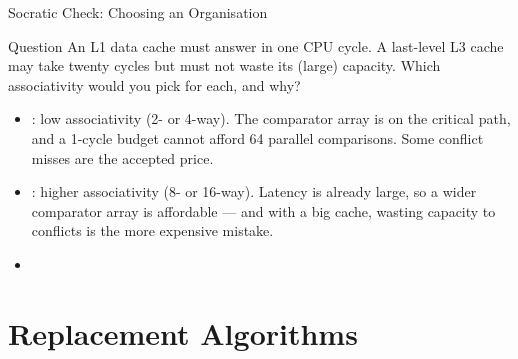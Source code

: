 \documentclass[aspectratio=169]{beamer}
\begin{document}
\begin{frame}{Socratic Check: Choosing an Organisation}
  \begin{alertblock}{Question}
    An L1 data cache must answer in one CPU cycle. A last-level L3 cache may
    take twenty cycles but must not waste its (large) capacity. Which
    associativity would you pick for each, and why?
  \end{alertblock}
  \begin{itemize}
    \item {}: low associativity (2- or 4-way). The comparator array is
      on the critical path, and a 1-cycle budget cannot afford 64 parallel
      comparisons. Some conflict misses are the accepted price.
    \item {}: higher associativity (8- or 16-way). Latency is already
      large, so a wider comparator array is affordable --- and with a big
      cache, wasting capacity to conflicts is the more expensive mistake.
    \item {}
  \end{itemize}
\end{frame}


\section{Replacement Algorithms}
\end{document}
